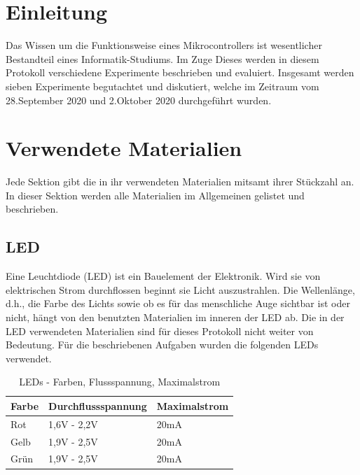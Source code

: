 \documentclass[11pt]{article}
\begin{document}
    

    \tableofcontents
    \newpage


    \section{Einleitung}
    \label{sec:einleitung}

    Das Wissen um die Funktionsweise eines Mikrocontrollers ist wesentlicher Bestandteil eines Informatik-Studiums.
    Im Zuge Dieses werden in diesem Protokoll verschiedene Experimente beschrieben und evaluiert.
    Insgesamt werden sieben Experimente begutachtet und diskutiert, welche im Zeitraum vom 28.September 2020 und 2.Oktober 2020 durchgeführt wurden.


    \section{Verwendete Materialien}
    \label{sec:verwendete-materialien}

    Jede Sektion gibt die in ihr verwendeten Materialien mitsamt ihrer Stückzahl an.
    In dieser Sektion werden alle Materialien im Allgemeinen gelistet und beschrieben.

    \subsection{LED}
    \label{subsec:led}
    Eine Leuchtdiode (LED) ist ein Bauelement der Elektronik.
    Wird sie von elektrischen Strom durchflossen beginnt sie Licht auszustrahlen.
    Die Wellenlänge, d.h., die Farbe des Lichts sowie ob es für das menschliche Auge sichtbar ist oder nicht, hängt von den benutzten Materialien im inneren der LED ab.
    Die in der LED verwendeten Materialien sind für dieses Protokoll nicht weiter von Bedeutung.
    Für die beschriebenen Aufgaben wurden die folgenden LEDs verwendet.

    \begin{table}[h]
        \centering
        \caption{LEDs - Farben, Flussspannung, Maximalstrom \cite{led-elektrische-eigenschaften}}
        \label{tab:leds-farben-und-elemente}
        \begin{tabular}{| l | l | l |}
            \hline
            Farbe & Durchflussspannung & Maximalstrom \\
            \hline
            Rot   & 1,6V - 2,2V        & 20mA         \\
            Gelb  & 1,9V - 2,5V        & 20mA         \\
            Grün  & 1,9V - 2,5V        & 20mA         \\
            \hline
        \end{tabular}
    \end{table}
\end{document}
